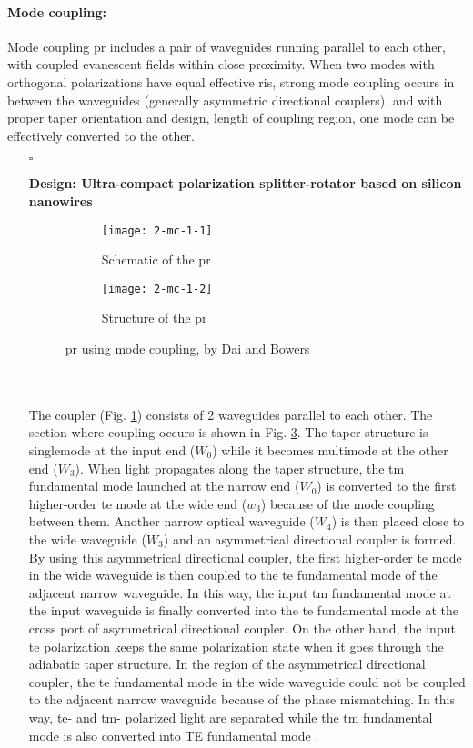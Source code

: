\documentclass[../report.tex]{subfiles}
\begin{document}
			\paragraph*{Mode coupling:} Mode coupling \gls{pr} includes a pair of waveguides running parallel to each other, with coupled evanescent fields within close proximity. When two modes with orthogonal polarizations have equal effective \gls{ri}s, strong mode coupling occurs in between the waveguides (generally asymmetric directional couplers), and with proper taper orientation and design, length of coupling region, one mode can be effectively converted to the other.
\begin{itemize}[leftmargin=*]
	\item[$\square$] \begin{minipage}[t]{\textwidth}\textbf{Design: Ultra-compact polarization splitter-rotator based on silicon nanowires}
	\begin{figure}[H] %
		\begin{subfigure}[t]{0.45\textwidth}
			\texttt{[image: 2-mc-1-1]}
			\caption{Schematic of the \gls{pr}}
			\label{fig:2_mc_1_1}
		\end{subfigure}
		\hfill
		\begin{subfigure}[t]{0.45\textwidth}
			\texttt{[image: 2-mc-1-2]}
			\caption{Structure of the \gls{pr}}
			\label{fig:2_mc_1_2}
		\end{subfigure}
		\caption{\gls{pr} using mode coupling, by Dai and Bowers \cite{dai_novel_2011}}
	\end{figure}
	\end{minipage}\\\\
	\noindent The coupler (Fig. \ref{fig:2_mc_1_1}) consists of 2 waveguides parallel to each other. The section where coupling occurs is shown in Fig. \ref{fig:2_mc_1_2}. The taper structure is singlemode at the input end ($W_0$) while it becomes multimode at the other end ($W_3$). When light propagates along the taper structure, the \gls{tm} fundamental mode launched at the narrow end ($W_0$) is converted to the first higher-order \gls{te} mode at the wide end ($w_3$) because of the mode coupling between them. Another narrow optical waveguide ($W_4$) is then placed close to the wide waveguide ($W_3$) and an asymmetrical directional coupler is formed. By using this asymmetrical directional coupler, the first higher-order \gls{te} mode in the wide waveguide is then coupled to the \gls{te} fundamental mode of the adjacent narrow waveguide. In this way, the input \gls{tm} fundamental mode at the input waveguide is finally converted into the \gls{te} fundamental mode at the cross port of asymmetrical directional coupler. On the other hand, the input \gls{te} polarization keeps the same polarization state when it goes through the adiabatic taper structure. In the region of the asymmetrical directional coupler, the \gls{te} fundamental mode in the wide waveguide could not be coupled to the adjacent narrow waveguide because of the phase mismatching. In this way, \gls{te}- and \gls{tm}- polarized light are separated while the \gls{tm} fundamental mode is also converted into TE fundamental mode \cite{dai_novel_2011}.\par	


\end{itemize}
\end{document}
